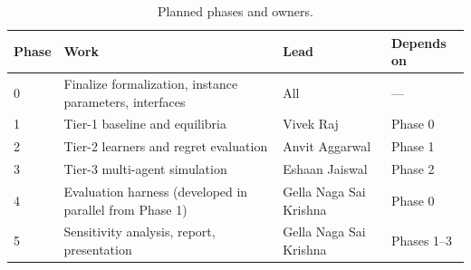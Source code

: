 \documentclass{article}
\theoremstyle{definition}
\theoremstyle{remark}
\begin{document}
\begin{table}[h]
  \caption{Planned phases and owners.}
  \centering
  \begin{tabular}{@{}llll@{}}
    \toprule
    Phase & Work & Lead & Depends on \\
    \midrule
    0 & Finalize formalization, instance parameters, interfaces & All & --- \\
    1 & Tier-1 baseline and equilibria & Vivek Raj & Phase 0 \\
    2 & Tier-2 learners and regret evaluation & Anvit Aggarwal & Phase 1 \\
    3 & Tier-3 multi-agent simulation & Eshaan Jaiswal & Phase 2 \\
    4 & Evaluation harness (developed in parallel from Phase 1) & Gella Naga Sai Krishna & Phase 0 \\
    5 & Sensitivity analysis, report, presentation & Gella Naga Sai Krishna & Phases 1--3 \\
    \bottomrule
  \end{tabular}
  \label{tab:timeline}
\end{table}


\end{document}
